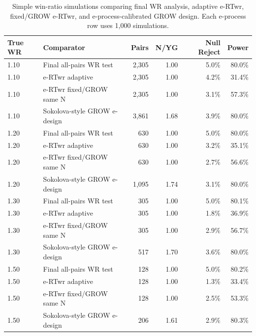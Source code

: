 \begin{table}[htbp]
\centering
\caption{Simple win-ratio simulations comparing final WR analysis, adaptive e-RTwr, fixed/GROW e-RTwr, and e-process-calibrated GROW design. Each e-process row uses 1{,}000 simulations.}
\begin{tabular}{@{}llrrrr@{}}
\toprule
True WR & Comparator & Pairs & N/YG & Null Reject & Power \\
\midrule
1.10 & Final all-pairs WR test & 2{,}305 & 1.00 & 5.0\% & 80.0\% \\
1.10 & e-RTwr adaptive & 2{,}305 & 1.00 & 4.2\% & 31.4\% \\
1.10 & e-RTwr fixed/GROW same N & 2{,}305 & 1.00 & 3.1\% & 57.3\% \\
1.10 & Sokolova-style GROW e-design & 3{,}861 & 1.68 & 3.9\% & 80.0\% \\
1.20 & Final all-pairs WR test & 630 & 1.00 & 5.0\% & 80.0\% \\
1.20 & e-RTwr adaptive & 630 & 1.00 & 3.2\% & 35.1\% \\
1.20 & e-RTwr fixed/GROW same N & 630 & 1.00 & 2.7\% & 56.6\% \\
1.20 & Sokolova-style GROW e-design & 1{,}095 & 1.74 & 3.1\% & 80.0\% \\
1.30 & Final all-pairs WR test & 305 & 1.00 & 5.0\% & 80.1\% \\
1.30 & e-RTwr adaptive & 305 & 1.00 & 1.8\% & 36.9\% \\
1.30 & e-RTwr fixed/GROW same N & 305 & 1.00 & 2.9\% & 56.7\% \\
1.30 & Sokolova-style GROW e-design & 517 & 1.70 & 3.6\% & 80.0\% \\
1.50 & Final all-pairs WR test & 128 & 1.00 & 5.0\% & 80.2\% \\
1.50 & e-RTwr adaptive & 128 & 1.00 & 1.3\% & 33.4\% \\
1.50 & e-RTwr fixed/GROW same N & 128 & 1.00 & 2.5\% & 53.3\% \\
1.50 & Sokolova-style GROW e-design & 206 & 1.61 & 2.9\% & 80.3\% \\
\bottomrule
\end{tabular}
\label{tab:ertwr_sokolova}
\end{table}
